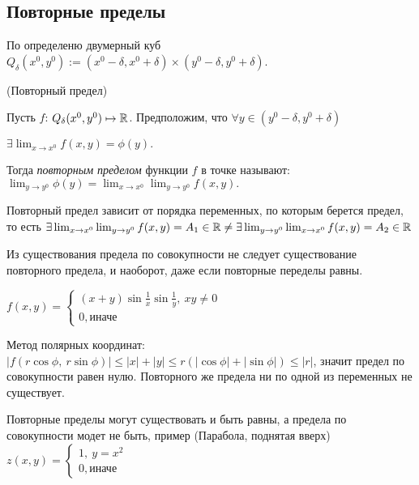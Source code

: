 \subsection{Повторные пределы}

По определеню двумерный куб $Q_{\delta}(x^0, y^0) := (x^0 - \delta, x^0 + \delta) \times (y^0 - \delta, y^0 + \delta)$.

\begin{definition} (Повторный предел)
    
Пусть $f$: $Q_{\delta}(x^0, y^0) \mapsto \mathbb{R}$. Предположим, что $\forall y \in (y^0 - \delta, y^0 + \delta)$

$\exists \lim_{x \to x^{0}} f(x, y) = \phi(y).$

Тогда \textit{повторным пределом} функции $f$ в точке называют: $\lim_{y \to y^0} \phi(y) = \lim_{x \to x^0} \lim_{y \to y^0} f(x, y).$
\end{definition}

\begin{note}
    Повторный предел зависит от порядка переменных, по которым берется предел, то есть $ \exists \lim_{x \to x^0} \lim_{y \to y^0} f(x, y) = A_1 \in \mathbb{R} \neq \exists \lim_{y \to y^0} \lim_{x \to x^0} f(x, y) = A_2 \in \mathbb{R}$
\end{note}

\begin{note}

    Из существования предела по совокупности не следует существование повторного предела, и наоборот, даже если повторные переделы равны.
\end{note}

\begin{example}
    $ f(x, y) =
    \begin{cases}
        (x + y)\sin\frac{1}{x} \sin \frac{1}{y}, \ xy \neq 0\\
        0, \text{иначе}&
    \end{cases}  
    $

    Метод полярных координат: $|f(r \cos\phi, \ r \sin\phi)| \leq |x| + |y| \leq r(|\cos\phi| + |\sin \phi|) \leq|r|$, значит предел по совокупности равен нулю. Повторного же предела ни по одной из переменных не существует.

\end{example}


\begin{note}
    Повторные пределы могут существовать и быть равны, а предела по совокупности модет не быть, пример (Парабола, поднятая вверх) $ z(x, y) =
    \begin{cases}
        1, \ y = x^2\\
        0, \text{иначе}&
    \end{cases}  
    $
\end{note}




